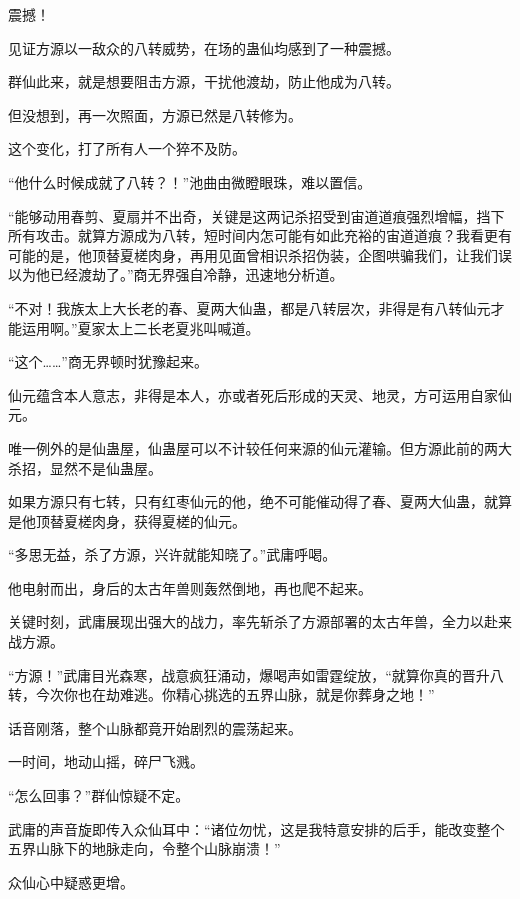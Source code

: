 
\begin{this_body}

震撼！

见证方源以一敌众的八转威势，在场的蛊仙均感到了一种震撼。

群仙此来，就是想要阻击方源，干扰他渡劫，防止他成为八转。

但没想到，再一次照面，方源已然是八转修为。

这个变化，打了所有人一个猝不及防。

“他什么时候成就了八转？！”池曲由微瞪眼珠，难以置信。

“能够动用春剪、夏扇并不出奇，关键是这两记杀招受到宙道道痕强烈增幅，挡下所有攻击。就算方源成为八转，短时间内怎可能有如此充裕的宙道道痕？我看更有可能的是，他顶替夏槎肉身，再用见面曾相识杀招伪装，企图哄骗我们，让我们误以为他已经渡劫了。”商无界强自冷静，迅速地分析道。

“不对！我族太上大长老的春、夏两大仙蛊，都是八转层次，非得是有八转仙元才能运用啊。”夏家太上二长老夏兆叫喊道。

“这个……”商无界顿时犹豫起来。

仙元蕴含本人意志，非得是本人，亦或者死后形成的天灵、地灵，方可运用自家仙元。

唯一例外的是仙蛊屋，仙蛊屋可以不计较任何来源的仙元灌输。但方源此前的两大杀招，显然不是仙蛊屋。

如果方源只有七转，只有红枣仙元的他，绝不可能催动得了春、夏两大仙蛊，就算是他顶替夏槎肉身，获得夏槎的仙元。

“多思无益，杀了方源，兴许就能知晓了。”武庸呼喝。

他电射而出，身后的太古年兽则轰然倒地，再也爬不起来。

关键时刻，武庸展现出强大的战力，率先斩杀了方源部署的太古年兽，全力以赴来战方源。

“方源！”武庸目光森寒，战意疯狂涌动，爆喝声如雷霆绽放，“就算你真的晋升八转，今次你也在劫难逃。你精心挑选的五界山脉，就是你葬身之地！”

话音刚落，整个山脉都竟开始剧烈的震荡起来。

一时间，地动山摇，碎尸飞溅。

“怎么回事？”群仙惊疑不定。

武庸的声音旋即传入众仙耳中：“诸位勿忧，这是我特意安排的后手，能改变整个五界山脉下的地脉走向，令整个山脉崩溃！”

众仙心中疑惑更增。


\end{this_body}

